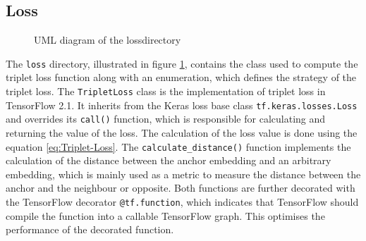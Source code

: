 \subsection{Loss}
\label{sub:Component-Loss}
\begin{figure}[htbp]
	\centering
	\caption{UML diagram of the \flqq loss\frqq directory}
	\label{fig:UML-Loss}
\end{figure}
\noindent
The \texttt{loss} directory, illustrated in figure \ref{fig:UML-Loss}, contains the class used to compute the triplet loss function along with an enumeration, which defines the strategy of the triplet loss. The \texttt{TripletLoss} class is the implementation of triplet loss in TensorFlow 2.1. It inherits from the Keras loss base class \texttt{tf.keras.losses.Loss} and overrides its \texttt{call()} function, which is responsible for calculating and returning the value of the loss. The calculation of the loss value is done using the equation \ref{eq:Triplet-Loss}. The \texttt{calculate\_distance()} function implements the calculation of the distance between the anchor embedding and an arbitrary embedding, which is mainly used as a metric to measure the distance between the anchor and the neighbour or opposite. Both functions are further decorated with the TensorFlow decorator \texttt{@tf.function}, which indicates that TensorFlow should compile the function into a callable TensorFlow graph. This optimises the performance of the decorated function.
